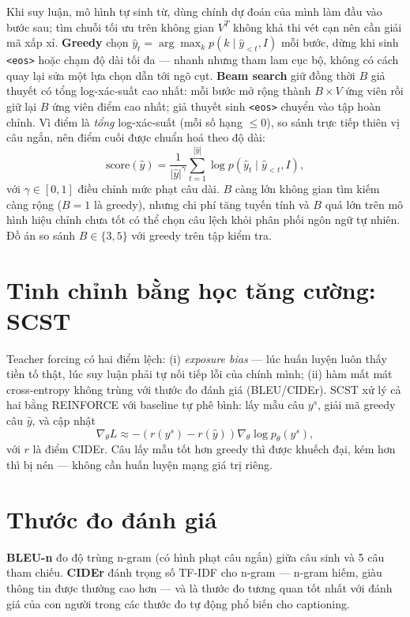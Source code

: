 Khi suy luận, mô hình tự sinh từ, dùng chính dự đoán của mình làm đầu vào bước
sau; tìm chuỗi tối ưu trên không gian $V^T$ không khả thi vét cạn nên cần giải
mã xấp xỉ. \textbf{Greedy} chọn
$\hat y_t = \arg\max_k p(k \mid \hat y_{<t}, I)$ mỗi bước, dừng khi sinh
\texttt{<eos>} hoặc chạm độ dài tối đa --- nhanh nhưng tham lam cục bộ, không
có cách quay lại sửa một lựa chọn dẫn tới ngõ cụt. \textbf{Beam search} giữ
đồng thời $B$ giả thuyết có tổng log-xác-suất cao nhất: mỗi bước mở rộng thành
$B \times V$ ứng viên rồi giữ lại $B$ ứng viên điểm cao nhất; giả thuyết sinh
\texttt{<eos>} chuyển vào tập hoàn chỉnh. Vì điểm là \emph{tổng} log-xác-suất
(mỗi số hạng $\leq 0$), so sánh trực tiếp thiên vị câu ngắn, nên điểm cuối được
chuẩn hoá theo độ dài:
\begin{equation}
	\text{score}(\hat y) = \frac{1}{|\hat y|^{\gamma}} \sum_{t=1}^{|\hat y|}
	\log p(\hat y_t \mid \hat y_{<t}, I),
\end{equation}
với $\gamma \in [0,1]$ điều chỉnh mức phạt câu dài. $B$ càng lớn không gian tìm
kiếm càng rộng ($B=1$ là greedy), nhưng chi phí tăng tuyến tính và $B$ quá lớn
trên mô hình hiệu chỉnh chưa tốt có thể chọn câu lệch khỏi phân phối ngôn ngữ
tự nhiên. Đồ án so sánh $B \in \{3, 5\}$ với greedy trên tập kiểm tra.

\section{Tinh chỉnh bằng học tăng cường: SCST}

Teacher forcing có hai điểm lệch: (i) \emph{exposure bias} --- lúc huấn luyện luôn
thấy tiền tố thật, lúc suy luận phải tự nối tiếp lỗi của chính mình; (ii) hàm mất
mát cross-entropy không trùng với thước đo đánh giá (BLEU/CIDEr).
SCST \autocite{rennie2017self} xử lý cả hai bằng REINFORCE với baseline tự phê
bình: lấy mẫu câu $y^s$, giải mã greedy câu $\hat{y}$, và cập nhật
\begin{equation}
	\nabla_\theta L \approx -\left(r(y^s) - r(\hat{y})\right)
	\nabla_\theta \log p_\theta(y^s),
\end{equation}
với $r$ là điểm CIDEr. Câu lấy mẫu tốt hơn greedy thì được khuếch đại, kém hơn
thì bị nén --- không cần huấn luyện mạng giá trị riêng.

\section{Thước đo đánh giá}

\textbf{BLEU-n} \autocite{papineni2002bleu} đo độ trùng n-gram (có hình phạt câu
ngắn) giữa câu sinh và 5 câu tham chiếu. \textbf{CIDEr} \autocite{vedantam2015cider}
đánh trọng số TF-IDF cho n-gram --- n-gram hiếm, giàu thông tin được thưởng cao
hơn --- và là thước đo tương quan tốt nhất với đánh giá của con người trong các
thước đo tự động phổ biến cho captioning.
